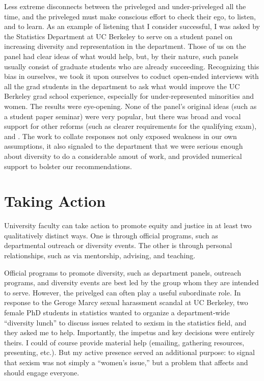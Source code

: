 \documentclass{article}
\begin{document}
Less extreme disconnects between the priveleged and under-priveleged all the
time, and the priveleged must make conscious effort to check their ego, to
listen, and to learn.  As an example of listening that I consider successful, I
was asked by the Statistics Department at UC Berkeley to serve on a student
panel on increasing diversity and representation in the department.  Those of us
on the panel had clear ideas of what would help, but, by their nature, such
panels usually consist of graduate students who are already succeeding.
Recognizing this bias in ourselves, we took it upon ourselves to coduct
open-ended interviews with all the grad students in the department to ask what
would improve the UC Berkeley grad school experience, especially for
under-represented minorities and women. The results were eye-opening.  None of
the panel's original ideas (such as a student paper seminar) were very popular,
but there was broad and vocal support for other reforms (such as clearer
requirements for the qualifying exam), and . The work to collate responses not
only exposed weakness in our own assumptions, it also signaled to the department
that we were serious enough about diversity to do a considerable amout of work,
and provided numerical support to bolster our recommendations.




\section{Taking Action}

University faculty can take action to promote equity and justice in at least two
qualitatively distinct ways.  One is through official programs, such as
departmental outreach or diversity events.  The other is through personal
relationships, such as via mentorship, advising, and teaching.

Official programs to promote diversity, such as department panels, outreach
programs, and diversity events are best led by the group whom they are intended
to serve.  However, the privelged can often play a useful subordinate role.  In
response to the Geroge Marcy sexual harassment scandal at UC Berkeley, two
female PhD students in statistics wanted to organize a department-wide
``diversity lunch'' to discuss issues related to sexism in the statistics field,
and they asked me to help.  Importantly, the impetus and key decisions were
entirely theirs.  I could of course provide material help (emailing, gathering
resources, presenting, etc.). But my active presence served an additional
purpose: to signal that sexism was not simply a ``women's issue,'' but a problem
that affects and should engage everyone.
\end{document}
